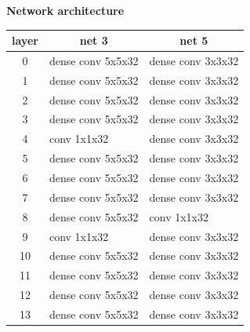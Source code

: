 \documentclass[xcolor=dvipsnames]{beamer}
\begin{document}
\begin{frame}{\bf Network architecture}

{\fontsize{8}{6}\selectfont

\begin{table}[]
\begin{tabular}{|c|l|l|}
\hline
\textbf{layer} & \multicolumn{1}{c|}{\textbf{net 3}}       & \multicolumn{1}{c|}{\textbf{net 5}}       \\ \hline
0              & \cellcolor[HTML]{FD6864}dense conv 5x5x32 & \cellcolor[HTML]{FD6864}dense conv 3x3x32 \\ \hline
1              & \cellcolor[HTML]{FD6864}dense conv 5x5x32 & \cellcolor[HTML]{FD6864}dense conv 3x3x32 \\ \hline
2              & \cellcolor[HTML]{FD6864}dense conv 5x5x32 & \cellcolor[HTML]{FD6864}dense conv 3x3x32 \\ \hline
3              & \cellcolor[HTML]{FD6864}dense conv 5x5x32 & \cellcolor[HTML]{FD6864}dense conv 3x3x32 \\ \hline
4              & \cellcolor[HTML]{38FFF8}conv 1x1x32       & \cellcolor[HTML]{FD6864}dense conv 3x3x32 \\ \hline
5              & \cellcolor[HTML]{FD6864}dense conv 5x5x32 & \cellcolor[HTML]{FD6864}dense conv 3x3x32 \\ \hline
6              & \cellcolor[HTML]{FD6864}dense conv 5x5x32 & \cellcolor[HTML]{FD6864}dense conv 3x3x32 \\ \hline
7              & \cellcolor[HTML]{FD6864}dense conv 5x5x32 & \cellcolor[HTML]{FD6864}dense conv 3x3x32 \\ \hline
8              & \cellcolor[HTML]{FD6864}dense conv 5x5x32 & \cellcolor[HTML]{38FFF8}conv 1x1x32       \\ \hline
9              & \cellcolor[HTML]{38FFF8}conv 1x1x32       & \cellcolor[HTML]{FD6864}dense conv 3x3x32 \\ \hline
10             & \cellcolor[HTML]{FD6864}dense conv 5x5x32 & \cellcolor[HTML]{FD6864}dense conv 3x3x32 \\ \hline
11             & \cellcolor[HTML]{FD6864}dense conv 5x5x32 & \cellcolor[HTML]{FD6864}dense conv 3x3x32 \\ \hline
12             & \cellcolor[HTML]{FD6864}dense conv 5x5x32 & \cellcolor[HTML]{FD6864}dense conv 3x3x32 \\ \hline
13             & \cellcolor[HTML]{FD6864}dense conv 5x5x32 & \cellcolor[HTML]{FD6864}dense conv 3x3x32 \\ \hline

\end{tabular}
\end{table}}
\end{frame}
\end{document}
